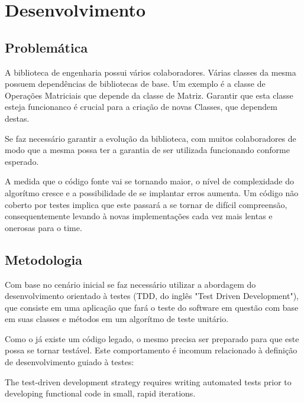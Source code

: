 \documentclass[
	article,			%
	12pt,				%
	oneside,			%
	a4paper,			%
	english,			
	brazil,
	sumario=tradicional
	]{abntex2}
\begin{document}

\pagebreak
\section{Desenvolvimento}

\subsection{Problemática}

A biblioteca de engenharia possui vários colaboradores. Várias classes da mesma possuem dependências de bibliotecas de base. Um exemplo é a classe de Operações Matriciais que depende da classe de Matriz. Garantir que esta classe esteja funcionanco é crucial para a criação de novas Classes, que dependem destas.

Se faz necessário garantir a evolução da biblioteca, com muitos colaboradores de modo que a mesma possa ter a garantia de ser utilizada funcionando conforme esperado.

A medida que o código fonte vai se tornando maior, o nível de complexidade do algorítmo cresce e a possibilidade de se implantar erros aumenta. Um código não coberto por testes implica que este passará a se tornar de difícil compreensão, consequentemente levando à novas implementações cada vez mais lentas e onerosas para o time.


\subsection{Metodologia}
Com base no cenário inicial se faz necessário utilizar a abordagem do desenvolvimento orientado à testes (TDD, do inglês "Test Driven Development"), que consiste em uma aplicação que fará o teste do software em questão com base em suas classes e métodos em um algorítmo de teste unitário.

Como o já existe um código legado, o mesmo precisa ser preparado para que este possa se tornar testável. Este comportamento é incomum relacionado à definição de desenvolvimento guiado à testes:

\begin{citacao}
The test-driven development strategy 
requires writing automated tests prior to 
developing functional code in small, rapid 
iterations.
	\cite[Introduction]{testdrivendevelopment.1}
\end{citacao}
\end{document}
